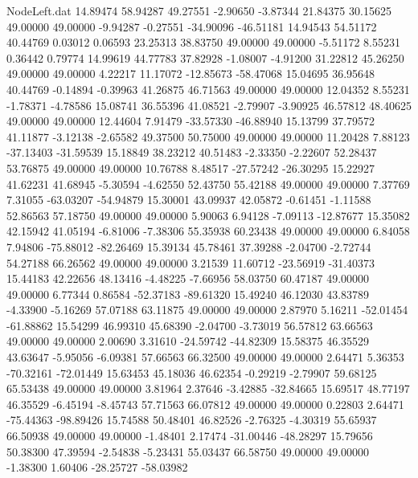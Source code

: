 \begin{filecontents}{NodeLeft.dat}
  14.89474   58.94287   49.27551    -2.90650   -3.87344   21.84375   30.15625   49.00000   49.00000   -9.94287   -0.27551  -34.90096  -46.51181
  14.94543   54.51172   40.44769     0.03012    0.06593   23.25313   38.83750   49.00000   49.00000   -5.51172    8.55231    0.36442    0.79774
  14.99619   44.77783   37.82928    -1.08007   -4.91200   31.22812   45.26250   49.00000   49.00000    4.22217   11.17072  -12.85673  -58.47068
  15.04695   36.95648   40.44769    -0.14894   -0.39963   41.26875   46.71563   49.00000   49.00000   12.04352    8.55231   -1.78371   -4.78586
  15.08741   36.55396   41.08521    -2.79907   -3.90925   46.57812   48.40625   49.00000   49.00000   12.44604    7.91479  -33.57330  -46.88940
  15.13799   37.79572   41.11877    -3.12138   -2.65582   49.37500   50.75000   49.00000   49.00000   11.20428    7.88123  -37.13403  -31.59539
  15.18849   38.23212   40.51483    -2.33350   -2.22607   52.28437   53.76875   49.00000   49.00000   10.76788    8.48517  -27.57242  -26.30295
  15.22927   41.62231   41.68945    -5.30594   -4.62550   52.43750   55.42188   49.00000   49.00000    7.37769    7.31055  -63.03207  -54.94879
  15.30001   43.09937   42.05872    -0.61451   -1.11588   52.86563   57.18750   49.00000   49.00000    5.90063    6.94128   -7.09113  -12.87677
  15.35082   42.15942   41.05194    -6.81006   -7.38306   55.35938   60.23438   49.00000   49.00000    6.84058    7.94806  -75.88012  -82.26469
  15.39134   45.78461   37.39288    -2.04700   -2.72744   54.27188   66.26562   49.00000   49.00000    3.21539   11.60712  -23.56919  -31.40373
  15.44183   42.22656   48.13416    -4.48225   -7.66956   58.03750   60.47187   49.00000   49.00000    6.77344    0.86584  -52.37183  -89.61320
  15.49240   46.12030   43.83789    -4.33900   -5.16269   57.07188   63.11875   49.00000   49.00000    2.87970    5.16211  -52.01454  -61.88862
  15.54299   46.99310   45.68390    -2.04700   -3.73019   56.57812   63.66563   49.00000   49.00000    2.00690    3.31610  -24.59742  -44.82309
  15.58375   46.35529   43.63647    -5.95056   -6.09381   57.66563   66.32500   49.00000   49.00000    2.64471    5.36353  -70.32161  -72.01449
  15.63453   45.18036   46.62354    -0.29219   -2.79907   59.68125   65.53438   49.00000   49.00000    3.81964    2.37646   -3.42885  -32.84665
  15.69517   48.77197   46.35529    -6.45194   -8.45743   57.71563   66.07812   49.00000   49.00000    0.22803    2.64471  -75.44363  -98.89426
  15.74588   50.48401   46.82526    -2.76325   -4.30319   55.65937   66.50938   49.00000   49.00000   -1.48401    2.17474  -31.00446  -48.28297
  15.79656   50.38300   47.39594    -2.54838   -5.23431   55.03437   66.58750   49.00000   49.00000   -1.38300    1.60406  -28.25727  -58.03982

\end{filecontents}
